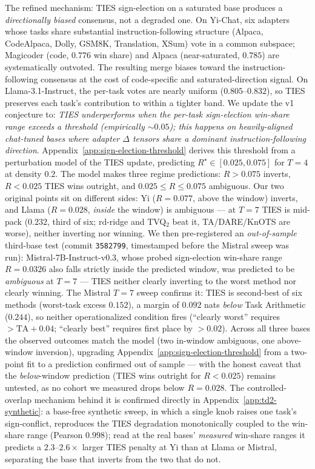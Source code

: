The refined mechanism: TIES sign-election on a saturated base
produces a \emph{directionally biased} consensus, not a degraded
one. On Yi-Chat, six adapters whose tasks share substantial
instruction-following structure (Alpaca, CodeAlpaca, Dolly, GSM8K,
Translation, XSum) vote in a common subspace; Magicoder (code,
$0.776$ win share) and Alpaca (near-saturated, $0.785$) are
systematically outvoted. The resulting merge biases toward the
instruction-following consensus at the cost of code-specific and
saturated-direction signal. On Llama-3.1-Instruct, the per-task
votes are nearly uniform ($0.805$--$0.832$), so TIES preserves
each task's contribution to within a tighter band. We update the
v1 conjecture to: \emph{TIES underperforms when the per-task
sign-election win-share range exceeds a threshold (empirically
$\sim 0.05$); this happens on heavily-aligned chat-tuned bases
where adapter $\Delta$ tensors share a dominant
instruction-following direction}. Appendix~\ref{app:sign-election-threshold}
derives this threshold from a perturbation model of the TIES
update, predicting $R^\star \in [0.025, 0.075]$ for $T = 4$ at
density $0.2$. The model makes three regime predictions: $R > 0.075$
inverts, $R < 0.025$ TIES wins outright, and $0.025 \leq R \leq 0.075$
ambiguous. Our two original points sit on different sides: Yi
($R = 0.077$, above the window) inverts, and Llama ($R = 0.028$,
\emph{inside} the window) is ambiguous --- at $T = 7$ TIES is mid-pack
($0.232$, third of six; rd-ridge and TVQ$_2$ beat it, TA/DARE/KnOTS
are worse), neither inverting nor winning. We then pre-registered an
\emph{out-of-sample}
third-base test (commit \texttt{3582799}, timestamped before the
Mistral sweep was run): Mistral-7B-Instruct-v0.3, whose probed
sign-election win-share range $R = 0.0326$ also falls strictly inside the
predicted window, was predicted to be \emph{ambiguous} at $T = 7$ ---
TIES neither clearly inverting to the worst method nor clearly winning.
The Mistral $T = 7$ sweep confirms it: TIES is second-best of six
methods (worst-task excess $0.152$), a margin of $0.092$ nats
\emph{below} Task Arithmetic ($0.244$), so neither operationalized
condition fires (``clearly worst'' requires $> \mathrm{TA} + 0.04$;
``clearly best'' requires first place by $> 0.02$). Across all three
bases the observed outcomes match the model (two in-window ambiguous,
one above-window inversion), upgrading
Appendix~\ref{app:sign-election-threshold} from a two-point fit to a
prediction confirmed out of sample --- with the honest caveat that the
\emph{below}-window prediction (TIES wins outright for $R < 0.025$)
remains untested, as no cohort we measured drops below $R = 0.028$. The controlled-overlap
mechanism behind it is confirmed directly in
Appendix~\ref{app:td2-synthetic}: a base-free synthetic sweep, in which
a single knob raises one task's sign-conflict, reproduces the TIES
degradation monotonically coupled to the win-share range (Pearson
$0.998$); read at the real bases' \emph{measured} win-share ranges it
predicts a $2.3$--$2.6\times$ larger TIES penalty at Yi than at Llama or
Mistral, separating the base that inverts from the two that do not.

